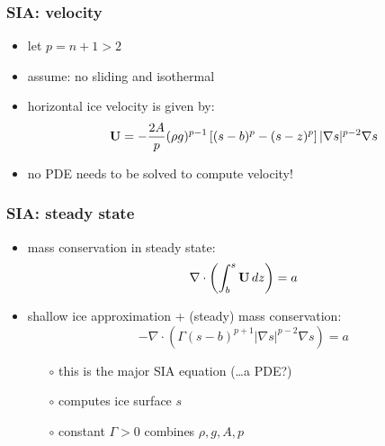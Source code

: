 \documentclass{beamer}
\newcommand{\Div}{\nabla\cdot}
\begin{document}
\begin{frame}
  \frametitle{SIA: velocity}
 
\begin{itemize}
\item let $p=n+1>2$
\item assume: no sliding and isothermal
\item horizontal ice velocity is given by: 
  $${\bf U}  =  - \frac{2 A}{p} (\rho g)^{p-1} \left[ (s-b)^p - (s - z)^p  \right] 
|\nabla s |^{p-2} \nabla s$$
\item no PDE needs to be solved to compute velocity!
\end{itemize}
\end{frame}


\begin{frame}
  \frametitle{SIA: steady state}

\begin{itemize}
\item mass conservation in steady state: 
  $$\Div \left(  \int_b^s {\bf U}\, dz \right)  =  a$$
\item shallow ice approximation + (steady) mass conservation:
  $$- \Div \left(\Gamma (s-b)^{p+1} | \nabla s |^{p-2} \nabla s  \right) =  a$$
  \begin{itemize}
  \vspace{-0.2in}
  \item[$\circ$] this is the major SIA equation (\dots a PDE?)
  \item[$\circ$] computes ice surface $s$
  \item[$\circ$] constant $\Gamma > 0$ combines $\rho,g,A,p$
  \end{itemize}
\end{itemize}
\end{frame}
\end{document}

